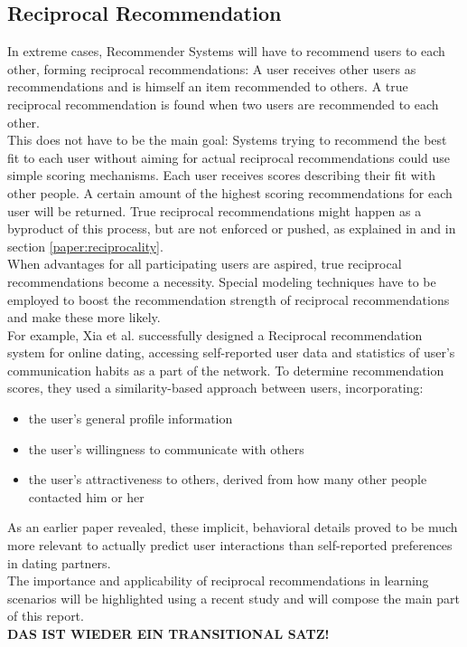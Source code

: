\documentclass[conference]{IEEEtran}
\begin{document}
\subsection{Reciprocal Recommendation}\label{rw:reciprocalrec}
In extreme cases, Recommender Systems will have to recommend users to each other, forming reciprocal recommendations: A user receives other users as recommendations and is himself an item recommended to others. A true reciprocal recommendation is found when two users are recommended to each other.\\
This does not have to be the main goal: Systems trying to recommend the best fit to each user without aiming for actual reciprocal recommendations could use simple scoring mechanisms. Each user receives scores describing their fit with other people. A certain amount of the highest scoring recommendations for each user will be returned. True reciprocal recommendations might happen as a byproduct of this process, but are not enforced or pushed, as explained in \cite{potts2018reciprocal} and in section \ref{paper:reciprocality}.\\
When advantages for all participating users are aspired, true reciprocal recommendations become a necessity. Special modeling techniques have to be employed to boost the recommendation strength of reciprocal recommendations and make these more likely.\\
For example, Xia et al. successfully designed a Reciprocal recommendation system for online dating, accessing self-reported user data and statistics of user's communication habits as a part of the network. \cite{xia2015reciprocal} To determine recommendation scores, they used a similarity-based approach between users, incorporating:\\
\begin{itemize}
	\item the user's general profile information
	\item the user's willingness to communicate with others
	\item the user's attractiveness to others, derived from how many other people contacted him or her
\end{itemize}
As an earlier paper revealed, these implicit, behavioral details proved to be much more relevant to actually predict user interactions than self-reported preferences in dating partners. \cite{xia2014characterization}\\
The importance and applicability of reciprocal recommendations in learning scenarios will be highlighted using a recent study and will compose the main part of this report.\\ \textbf{DAS IST WIEDER EIN TRANSITIONAL SATZ!}
\end{document}
